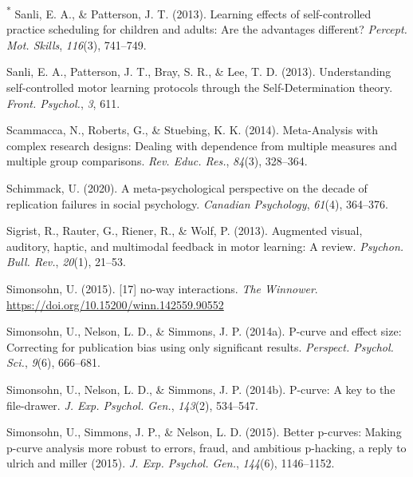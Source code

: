 \documentclass[
  english,
  man,floatsintext]{apa7}
\newlength{\cslhangindent}
\newlength{\cslentryspacingunit} %
\newenvironment{CSLReferences}[2] %
 {%
  \setlength{\parindent}{0pt}
  \ifodd #1
  \let\oldpar\par
  \def\par{\hangindent=\cslhangindent\oldpar}
  \fi
  \setlength{\parskip}{#2\cslentryspacingunit}
 }%
 {}
\begin{document}
\begin{CSLReferences}{1}{0}
\leavevmode{}%
\textsuperscript{*} Sanli, E. A., \& Patterson, J. T. (2013). Learning effects of self-controlled practice scheduling for children and adults: Are the advantages different? \emph{Percept. Mot. Skills}, \emph{116}(3), 741--749.

\leavevmode{}%
Sanli, E. A., Patterson, J. T., Bray, S. R., \& Lee, T. D. (2013). Understanding self-controlled motor learning protocols through the {Self-Determination} theory. \emph{Front. Psychol.}, \emph{3}, 611.

\leavevmode{}%
Scammacca, N., Roberts, G., \& Stuebing, K. K. (2014). {Meta-Analysis} with complex research designs: Dealing with dependence from multiple measures and multiple group comparisons. \emph{Rev. Educ. Res.}, \emph{84}(3), 328--364.

\leavevmode{}%
Schimmack, U. (2020). A meta-psychological perspective on the decade of replication failures in social psychology. \emph{Canadian Psychology}, \emph{61}(4), 364--376.

\leavevmode{}%
Sigrist, R., Rauter, G., Riener, R., \& Wolf, P. (2013). Augmented visual, auditory, haptic, and multimodal feedback in motor learning: A review. \emph{Psychon. Bull. Rev.}, \emph{20}(1), 21--53.

\leavevmode{}%
Simonsohn, U. (2015). {[}17{]} no-way interactions. \emph{The Winnower}. \url{https://doi.org/10.15200/winn.142559.90552}

\leavevmode{}%
Simonsohn, U., Nelson, L. D., \& Simmons, J. P. (2014a). P-curve and effect size: Correcting for publication bias using only significant results. \emph{Perspect. Psychol. Sci.}, \emph{9}(6), 666--681.

\leavevmode{}%
Simonsohn, U., Nelson, L. D., \& Simmons, J. P. (2014b). P-curve: A key to the file-drawer. \emph{J. Exp. Psychol. Gen.}, \emph{143}(2), 534--547.

\leavevmode{}%
Simonsohn, U., Simmons, J. P., \& Nelson, L. D. (2015). Better p-curves: Making p-curve analysis more robust to errors, fraud, and ambitious p-hacking, a reply to ulrich and miller (2015). \emph{J. Exp. Psychol. Gen.}, \emph{144}(6), 1146--1152.


\end{CSLReferences}
\end{document}
